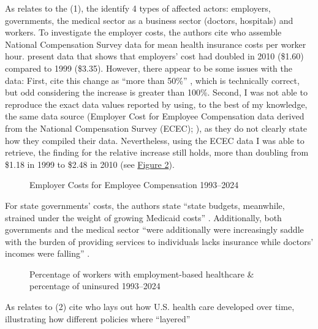 \documentclass[11pt]{article}
\begin{document}
As relates to the (1), the identify 4 types of affected actors: employers, governments, the medical sector as a business sector (doctors, hospitals) and workers. To investigate the employer costs, the authors cite \textcite[][]{Claxton2011} who assemble National Compensation Survey data for mean health insurance costs per worker hour. \textcite[][]{Claxton2011} present data that shows that employers' cost had doubled in 2010 (\$1.60) compared to 1999 (\$3.35). However, there appear to be some issues with the data: First, \textcite[][]{Jacobs2014} cite this change as \enquote{more than 50\%} , which is technically correct, but odd considering the increase is greater than 100\%. Second, I was not able to reproduce the exact data values reported by \textcite[][]{Claxton2011} using, to the best of my knowledge, the same data source (Employer Cost for Employee Compensation data derived from the National Compensation Survey (ECEC); ), as they do not clearly state how they compiled their data. Nevertheless, using the ECEC data I was able to retrieve, the finding for the relative increase still holds, more than doubling from \$1.18 in 1999 to \$2.48 in 2010 (see \hyperref[fig:ecec]{Figure 2}).

\begin{figure}[H]
  \sffamily
  \caption{Employer Costs for Employee Compensation 1993--2024}
  
  \label{fig:ecec}
\end{figure}

For state governments' costs, the authors state \enquote{state budgets, meanwhile, strained under the weight of growing Medicaid costs} \parencite[][p. 451]{Jacobs2014}. Additionally, both governments and the medical sector \enquote{were additionally were increasingly saddle with the burden of providing services to individuals lacks insurance while doctors' incomes were falling} .

\begin{figure}[H]
  \sffamily
  \caption{Percentage of workers with employment-based healthcare \& percentage of uninsured 1993--2024}
  
  \label{fig:emp_un}
\end{figure}

As relates to (2)\textcite[][]{Jacobs2014} cite \textcite[][]{Hacker1998} who lays out how U.S. health care developed over time, illustrating how different policies where \enquote{layered}

\end{document}
